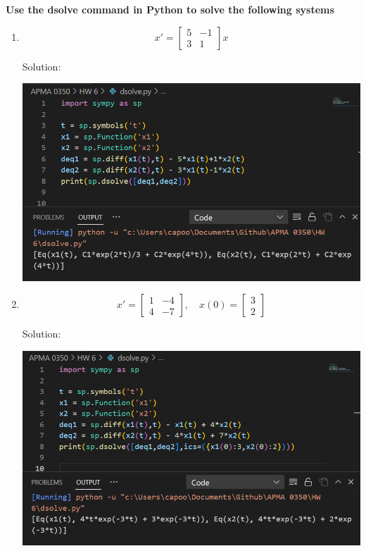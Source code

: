 \documentclass[12pt]{article}
\begin{document}
\textbf{Use the dsolve command in Python to solve the following systems}
\begin{enumerate}
    \item \[x' = \begin{bmatrix}
        5 & -1\\
        3 & 1
    \end{bmatrix}x\]

    Solution:

    \includegraphics{Images/dsolve-a.png}

    \pagebreak

    \item \[x' = \begin{bmatrix}
        1 & -4\\
        4 & -7
    \end{bmatrix}, \quad x(0) = \begin{bmatrix}
        3\\2
    \end{bmatrix}\]

    Solution:

    \includegraphics{Images/dsolve-b.png}
\end{enumerate}
\end{document}
